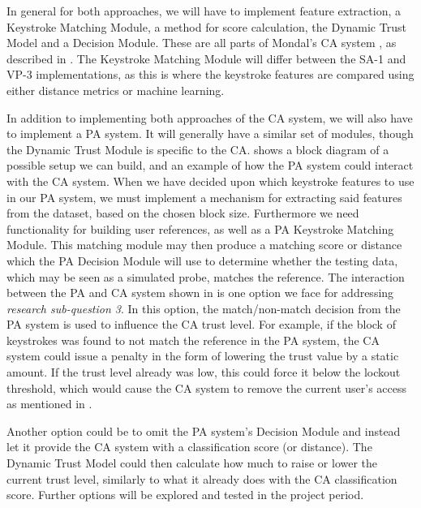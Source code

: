 \documentclass[informationsecurity]{gucmasterproject}
\begin{document}
In general for both approaches, we will have to implement feature extraction, a Keystroke Matching Module, a method for score calculation, the Dynamic Trust Model and a Decision Module.
These are all parts of Mondal's CA system \cite{mondal}, as described in .
The Keystroke Matching Module will differ between the SA-1 and VP-3 implementations, as this is where the keystroke features are compared using either distance metrics or machine learning.

In addition to implementing both approaches of the CA system, we will also have to implement a PA system.
It will generally have a similar set of modules, though the Dynamic Trust Module is specific to the CA.
 shows a block diagram of a possible setup we can build, and an example of how the PA system could interact with the CA system.
When we have decided upon which keystroke features to use in our PA system, we must implement a mechanism for extracting said features from the dataset, based on the chosen block size.
Furthermore we need functionality for building user references, as well as a PA Keystroke Matching Module.
This matching module may then produce a matching score or distance which the PA Decision Module will use to determine whether the testing data, which may be seen as a simulated probe, matches the reference.
The interaction between the PA and CA system shown in  is one option we face for addressing \textit{research sub-question 3}.
In this option, the match/non-match decision from the PA system is used to influence the CA trust level.
For example, if the block of keystrokes was found to not match the reference in the PA system, the CA system could issue a penalty in the form of lowering the trust value by a static amount.
If the trust level already was low, this could force it below the lockout threshold, which would cause the CA system to remove the current user's access as mentioned in .

Another option could be to omit the PA system's Decision Module and instead let it provide the CA system with a classification score (or distance).
The Dynamic Trust Model could then calculate how much to raise or lower the current trust level, similarly to what it already does with the CA classification score.
Further options will be explored and tested in the project period.
\end{document}
